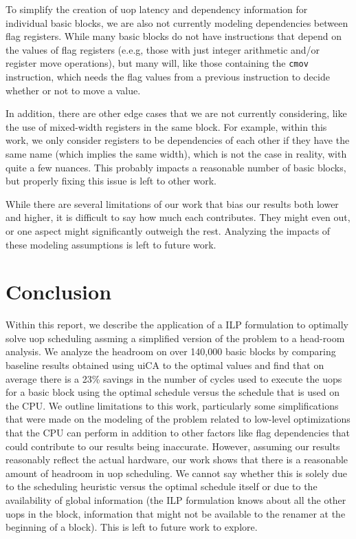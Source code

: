\documentclass[sigconf]{acmart}
\begin{document}
To simplify the creation of uop latency and dependency information for individual basic blocks, we are also not currently
modeling dependencies between flag registers. While many basic blocks do not have instructions that depend on the values
of flag registers (e.e.g, those with just integer arithmetic and/or register move operations), but many will, like those
containing the \texttt{cmov} instruction, which needs the flag values from a previous instruction to decide whether
or not to move a value.

In addition, there are other edge cases that we are not currently considering, like the use of mixed-width registers
in the same block. For example, within this work, we only consider registers to be dependencies of each other if they
have the same name (which implies the same width), which is not the case in reality, with quite a few nuances. This
probably impacts a reasonable number of basic blocks, but properly fixing this issue is left to other work.

While there are several limitations of our work that bias our results both lower and higher, it is difficult to say how much
each contributes. They might even out, or one aspect might significantly outweigh the rest. Analyzing the impacts of these
modeling assumptions is left to future work.

\section{Conclusion}

Within this report, we describe the application of a ILP formulation to optimally solve uop scheduling assming a
simplified version of the problem to a head-room analysis. We analyze the headroom on over 140,000 basic blocks
by comparing baseline results obtained using uiCA to the optimal values and find that on average there is a 23\%
savings in the number of cycles used to execute the uops for a basic block using the optimal schedule versus the
schedule that is used on the CPU. We outline limitations to this work, particularly some simplifications that were
made on the modeling of the problem related to low-level optimizations that the CPU can perform in addition to
other factors like flag dependencies that could contribute to our results being inaccurate. However, assuming our
results reasonably reflect the actual hardware, our work shows that there is a reasonable amount of headroom in
uop scheduling. We cannot say whether this is solely due to the scheduling heuristic versus the optimal schedule
itself or due to the availability of global information (the ILP formulation knows about all the other uops in the
block, information that might not be available to the renamer at the beginning of a block). This is left to future
work to explore.
\end{document}
